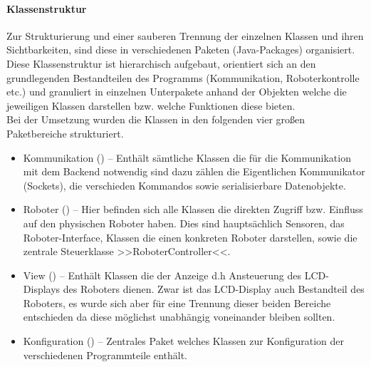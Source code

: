 \paragraph{Klassenstruktur}
\color{finishing}             %
Zur Strukturierung und einer sauberen Trennung der einzelnen Klassen und ihren Sichtbarkeiten, sind diese in verschiedenen 
Paketen (Java-Packages) organisiert. Diese Klassenstruktur ist hierarchisch aufgebaut, orientiert sich an den grundlegenden 
Bestandteilen des Programms (Kommunikation, Roboterkontrolle etc.) und granuliert in einzelnen Unterpakete anhand der Objekten 
welche die jeweiligen Klassen darstellen bzw. welche Funktionen diese bieten. \\
Bei der Umsetzung wurden die Klassen in den folgenden vier großen Paketbereiche strukturiert.
\begin{itemize}
	\item{Kommunikation ()} -- Enthält sämtliche Klassen die für die Kommunikation mit dem
	Backend notwendig sind dazu zählen die Eigentlichen Kommunikator (Sockets), die verschieden Kommandos sowie serialisierbare 
	Datenobjekte.
	\item{Roboter ()} -- Hier befinden sich alle Klassen die direkten Zugriff bzw. Einfluss auf den 
	physischen Roboter haben. Dies sind hauptsächlich Sensoren, das Roboter-Interface, Klassen die einen konkreten Roboter darstellen, 
	sowie die zentrale Steuerklasse >>RoboterController<<.
	\item{View ()} -- Enthält Klassen die der Anzeige d.h Ansteuerung des LCD-Displays des
	Roboters dienen. Zwar ist das LCD-Display auch Bestandteil des Roboters, es wurde sich aber für eine Trennung dieser beiden 
	Bereiche entschieden da diese möglichst unabhängig voneinander bleiben sollten.
	\item{Konfiguration ()} -- Zentrales Paket welches Klassen zur Konfiguration 
	der verschiedenen Programmteile enthält.
\end{itemize}
